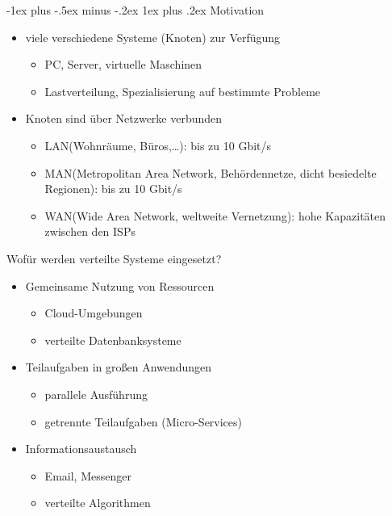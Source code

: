 \documentclass[10pt]{article}
\makeatletter
\renewcommand{\subsubsection}{\@startsection{subsubsection}{3}{0mm}%
                                {-1ex plus -.5ex minus -.2ex}%
                                {1ex plus .2ex}%
                                {\normalfont\small\bfseries}}
\makeatother
\begin{document}
\subsubsection{Motivation}
\begin{itemize}
  \item viele verschiedene Systeme (Knoten) zur Verfügung
        \begin{itemize}
          \item PC, Server, virtuelle Maschinen
          \item Lastverteilung, Spezialisierung auf bestimmte Probleme
        \end{itemize}
  \item Knoten sind über Netzwerke verbunden
        \begin{itemize}
          \item LAN(Wohnräume, Büros,…): bis zu 10 Gbit/s
          \item MAN(Metropolitan Area Network, Behördennetze, dicht besiedelte Regionen): bis zu 10 Gbit/s
          \item WAN(Wide Area Network, weltweite Vernetzung): hohe Kapazitäten zwischen den ISPs
        \end{itemize}
\end{itemize}
Wofür werden verteilte Systeme eingesetzt? 
\begin{itemize}
  \item Gemeinsame Nutzung von Ressourcen
        \begin{itemize}
          \item Cloud-Umgebungen
          \item verteilte Datenbanksysteme
                
        \end{itemize}
  \item Teilaufgaben in großen Anwendungen
        \begin{itemize}
          \item parallele Ausführung
          \item getrennte Teilaufgaben (Micro-Services)
                
        \end{itemize}
  \item Informationsaustausch
        \begin{itemize}
          \item Email, Messenger
          \item verteilte Algorithmen
        \end{itemize}
\end{itemize}
\end{document}
